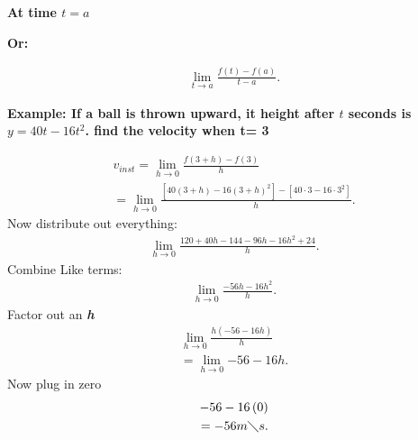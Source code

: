 \documentclass{report}
\begin{document}
        \bigbreak \noindent 
        \textbf{At time $t = a$}
        \begin{center}
            \textbf{Or:}
        \end{center}
        \begin{align*}
            \lim\limits_{t \to a}{ \frac{f(t) - f(a)}{t -a}}
        .\end{align*}

        \bigbreak \noindent 

        \bigbreak \noindent \bigbreak \noindent 
        \begin{large}
            \textbf{Example: If a ball is thrown upward, it height after $t$ seconds 
            is $y= 40t-16t^2$. find the velocity when t= 3
        }
        \end{large}
        \bigbreak \noindent \bigbreak \noindent \bigbreak \noindent 
        \begin{align*}
            v_{inst} = \lim\limits_{h \to 0}{ \frac{f(3+h) - f(3)}{h}} \\ 
            = \lim\limits_{h \to 0}{ \frac{[40(3+h) - 16(3+h)^2] - [40 \cdot 3 - 16 \cdot 3^2]}{h}}
        .\end{align*}
        \bigbreak \noindent 
        Now distribute out everything:
        \begin{align*}
            \lim\limits_{h \to 0}{ \frac{120+40h-144-96h-16h^2+24}{h}}
        .\end{align*}
        \bigbreak \noindent 
        Combine Like terms:
        \begin{align*}
            \lim\limits_{h \to 0}{ \frac{-56h-16h^2}{h}}
        .\end{align*}
        \bigbreak \noindent 
        Factor out an \textbf{\textit{h}}
        \begin{align*}
            \lim\limits_{h \to 0}{ \frac{h \left(-56-16h\right)}{h}} \\
            = \lim\limits_{h \to 0}{-56-16h}
        .\end{align*}
        \bigbreak \noindent 
        Now plug in zero
        \begin{align*}
            -56 -16 \left(0\right) \\ 
            = -56 m \diagdown s
        .\end{align*}
\end{document}
